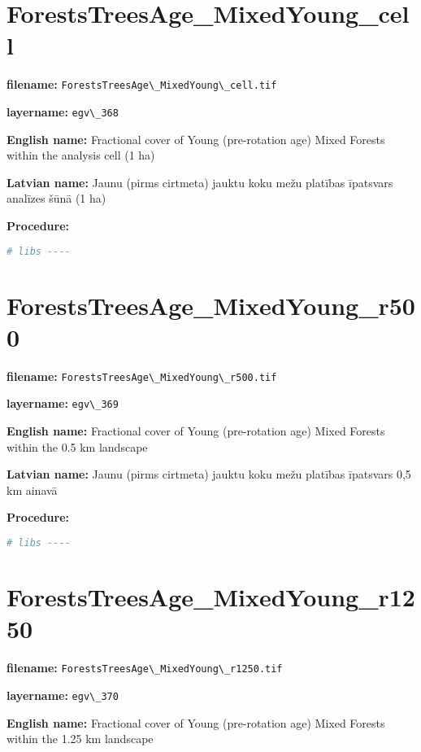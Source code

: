 \documentclass[
]{book}
\newcommand{\passthrough}[1]{#1}
\begin{document}
\section{ForestsTreesAge\_MixedYoung\_cell}\label{ch06.368}

\textbf{filename:} \passthrough{\lstinline!ForestsTreesAge\_MixedYoung\_cell.tif!}

\textbf{layername:} \passthrough{\lstinline!egv\_368!}

\textbf{English name:} Fractional cover of Young (pre-rotation age) Mixed Forests within the analysis cell (1 ha)

\textbf{Latvian name:} Jaunu (pirms cirtmeta) jauktu koku mežu platības īpatsvars analīzes šūnā (1 ha)

\textbf{Procedure:}

\begin{lstlisting}[language=R]
# libs ----
\end{lstlisting}

\section{ForestsTreesAge\_MixedYoung\_r500}\label{ch06.369}

\textbf{filename:} \passthrough{\lstinline!ForestsTreesAge\_MixedYoung\_r500.tif!}

\textbf{layername:} \passthrough{\lstinline!egv\_369!}

\textbf{English name:} Fractional cover of Young (pre-rotation age) Mixed Forests within the 0.5 km landscape

\textbf{Latvian name:} Jaunu (pirms cirtmeta) jauktu koku mežu platības īpatsvars 0,5 km ainavā

\textbf{Procedure:}

\begin{lstlisting}[language=R]
# libs ----
\end{lstlisting}

\section{ForestsTreesAge\_MixedYoung\_r1250}\label{ch06.370}

\textbf{filename:} \passthrough{\lstinline!ForestsTreesAge\_MixedYoung\_r1250.tif!}

\textbf{layername:} \passthrough{\lstinline!egv\_370!}

\textbf{English name:} Fractional cover of Young (pre-rotation age) Mixed Forests within the 1.25 km landscape
\end{document}
